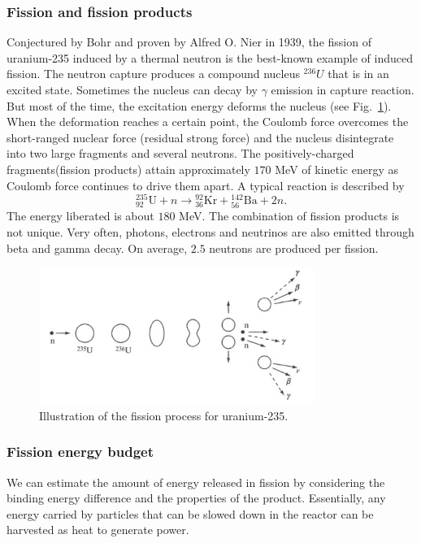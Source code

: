 \documentclass[nofootinbib,preprint,aps]{revtex4-1}
\begin{document}
        \subsubsection{Fission and fission products}
        Conjectured by Bohr and proven by Alfred O. Nier in 1939,
        the fission of uranium-235 induced by a thermal neutron
        is the best-known example of induced fission. 
        The neutron capture produces a compound nucleus ${}^{236}U$ that is in an excited state.
        Sometimes the nucleus can decay by $\gamma$ emission in capture reaction.
        But most of the time, the excitation energy deforms the nucleus (see Fig.~\ref{fig:fission}).
        When the
        deformation reaches a certain point, the Coulomb force overcomes the short-ranged nuclear
        force (residual strong force) and the nucleus disintegrate into two large fragments and several neutrons. The
        positively-charged fragments(fission products) attain approximately $170$ MeV of kinetic energy as
        Coulomb force continues to drive them apart.\cite{l01}
        A typical reaction is described by
        \begin{equation}
        {}^{235}_{92}\text{U} + n \rightarrow {}^{92}_{36}\text{Kr} + {}^{142}_{56}\text{Ba} + 2 n.
        \end{equation}
        The energy liberated is about $180$ MeV. The combination of fission products is not
        unique. \cite{w98, gc01}
        Very often, photons, electrons and neutrinos are also emitted through beta and gamma decay.
        On average, $2.5$ neutrons are produced per fission.\cite{l01} 
        \begin{figure}[h]
            \centering
            \includegraphics[width=0.8\textwidth]{fission.png}
            \caption{Illustration of the fission process for uranium-235.\cite{l01}}
            \label{fig:fission}
        \end{figure}

        \subsubsection{Fission energy budget}
        We can estimate the amount of energy released in fission by considering the binding energy difference
        and the properties of the product. Essentially, any energy carried by particles that can be slowed down 
        in the reactor can be harvested as heat to generate power.
\end{document}
